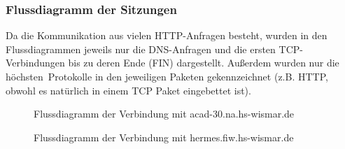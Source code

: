 \documentclass[11pt, a4paper]{article}
\begin{document}
\subsubsection{Flussdiagramm der Sitzungen}
Da die Kommunikation aus vielen HTTP-Anfragen besteht, wurden in den Flussdiagrammen jeweils nur die DNS-Anfragen und die ersten TCP-Verbindungen bis zu deren Ende (FIN) dargestellt. Außerdem wurden nur die \glqq höchsten\grqq\ Protokolle in den jeweiligen Paketen gekennzeichnet (z.B. HTTP, obwohl es natürlich in einem TCP Paket eingebettet ist).

\begin{figure}[H]
\centering
{}
\caption{Flussdiagramm der Verbindung mit acad-30.na.hs-wismar.de}
\end{figure}

\begin{figure}[H]
\centering
{}
\caption{Flussdiagramm der Verbindung mit hermes.fiw.hs-wismar.de}
\end{figure}
\end{document}
